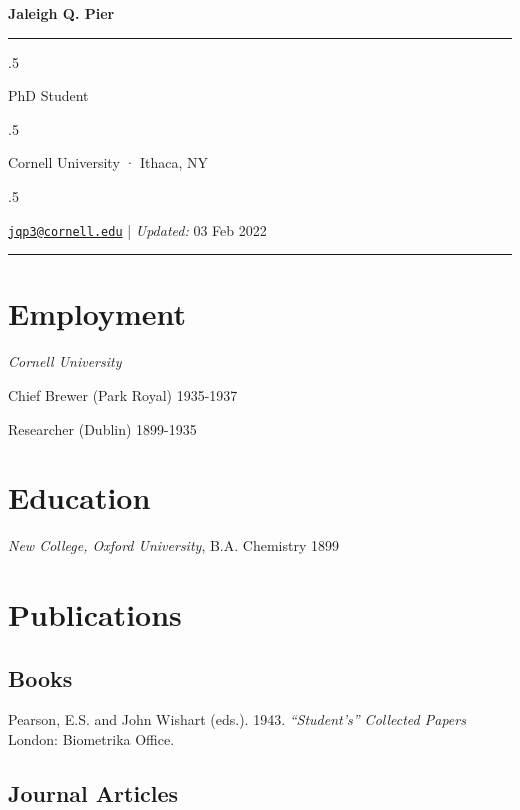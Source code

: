 \documentclass[11pt,]{article}
\begin{document}
\centerline{\huge \bf Jaleigh Q. Pier}

\vspace{2 mm}

\hrule

\vspace{2 mm}

\moveleft.5\hoffset\centerline{PhD Student}
\moveleft.5\hoffset\centerline{Cornell University · Ithaca, NY}
\moveleft.5\hoffset\centerline{ \faEnvelopeO \hspace{1 mm} \href{mailto:}{\tt \href{mailto:jqp3@cornell.edu}{\nolinkurl{jqp3@cornell.edu}}} \hspace{1 mm}         | \emph{Updated:} 03
Feb 2022}



\vspace{2 mm}

\hrule



\hypertarget{employment}{%
\section{Employment}\label{employment}}

\emph{Cornell University}

Chief Brewer (Park Royal) \hfill 1935-1937

Researcher (Dublin) \hfill 1899-1935

\hypertarget{education}{%
\section{Education}\label{education}}

\emph{New College, Oxford University}, B.A. Chemistry \hfill 1899

\hypertarget{publications}{%
\section{Publications}\label{publications}}

\hypertarget{books}{%
\subsection{Books}\label{books}}

Pearson, E.S. and John Wishart (eds.). 1943. \emph{``Student's''
Collected Papers} London: Biometrika Office.

\hypertarget{journal-articles}{%
\subsection{Journal Articles}\label{journal-articles}}
\end{document}
